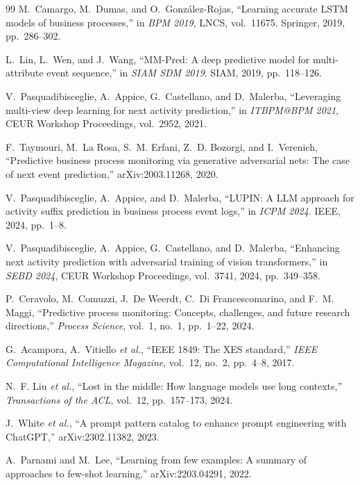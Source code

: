 \documentclass[a4paper,12pt,oneside]{report}
\begin{document}
\begin{thebibliography}{99}
 M.~Camargo, M.~Dumas, and O.~González-Rojas, ``Learning accurate LSTM models of business processes,'' in \textit{BPM 2019}, LNCS, vol.~11675. Springer, 2019, pp.~286--302.

 L.~Lin, L.~Wen, and J.~Wang, ``MM-Pred: A deep predictive model for multi-attribute event sequence,'' in \textit{SIAM SDM 2019}. SIAM, 2019, pp.~118--126.

 V.~Pasquadibisceglie, A.~Appice, G.~Castellano, and D.~Malerba, ``Leveraging multi-view deep learning for next activity prediction,'' in \textit{ITBPM@BPM 2021}, CEUR Workshop Proceedings, vol.~2952, 2021.

 F.~Taymouri, M.~La Rosa, S.~M. Erfani, Z.~D. Bozorgi, and I.~Verenich, ``Predictive business process monitoring via generative adversarial nets: The case of next event prediction,'' arXiv:2003.11268, 2020.

 V.~Pasquadibisceglie, A.~Appice, and D.~Malerba, ``LUPIN: A LLM approach for activity suffix prediction in business process event logs,'' in \textit{ICPM 2024}. IEEE, 2024, pp.~1--8.

 V.~Pasquadibisceglie, A.~Appice, G.~Castellano, and D.~Malerba, ``Enhancing next activity prediction with adversarial training of vision transformers,'' in \textit{SEBD 2024}, CEUR Workshop Proceedings, vol.~3741, 2024, pp.~349--358.

 P.~Ceravolo, M.~Comuzzi, J.~De Weerdt, C.~Di Francescomarino, and F.~M. Maggi, ``Predictive process monitoring: Concepts, challenges, and future research directions,'' \textit{Process Science}, vol.~1, no.~1, pp.~1--22, 2024.

 G.~Acampora, A.~Vitiello \textit{et al.}, ``IEEE 1849: The XES standard,'' \textit{IEEE Computational Intelligence Magazine}, vol.~12, no.~2, pp.~4--8, 2017.

 N.~F. Liu \textit{et al.}, ``Lost in the middle: How language models use long contexts,'' \textit{Transactions of the ACL}, vol.~12, pp.~157--173, 2024.

 J.~White \textit{et al.}, ``A prompt pattern catalog to enhance prompt engineering with ChatGPT,'' arXiv:2302.11382, 2023.

 A.~Parnami and M.~Lee, ``Learning from few examples: A summary of approaches to few-shot learning,'' arXiv:2203.04291, 2022.


\end{thebibliography}
\end{document}
